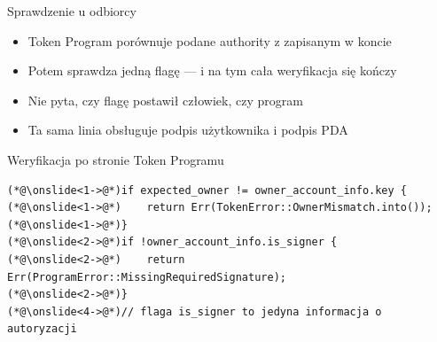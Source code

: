 \begin{frame}[fragile]{Sprawdzenie u odbiorcy}
  \begin{itemize}
    \item Token Program porównuje podane authority z zapisanym w koncie
    \item Potem sprawdza jedną flagę --- i na tym cała weryfikacja się kończy
    \item Nie pyta, czy flagę postawił człowiek, czy program
    \item Ta sama linia obsługuje podpis użytkownika i podpis PDA
  \end{itemize}
  \begin{codeblock}{Weryfikacja po stronie Token Programu}
\begin{lstlisting}[style=reveal]
(*@\onslide<1->@*)if expected_owner != owner_account_info.key {
(*@\onslide<1->@*)    return Err(TokenError::OwnerMismatch.into());
(*@\onslide<1->@*)}
(*@\onslide<2->@*)if !owner_account_info.is_signer {
(*@\onslide<2->@*)    return Err(ProgramError::MissingRequiredSignature);
(*@\onslide<2->@*)}
(*@\onslide<4->@*)// flaga is_signer to jedyna informacja o autoryzacji
\end{lstlisting}
  \end{codeblock}
\end{frame}

